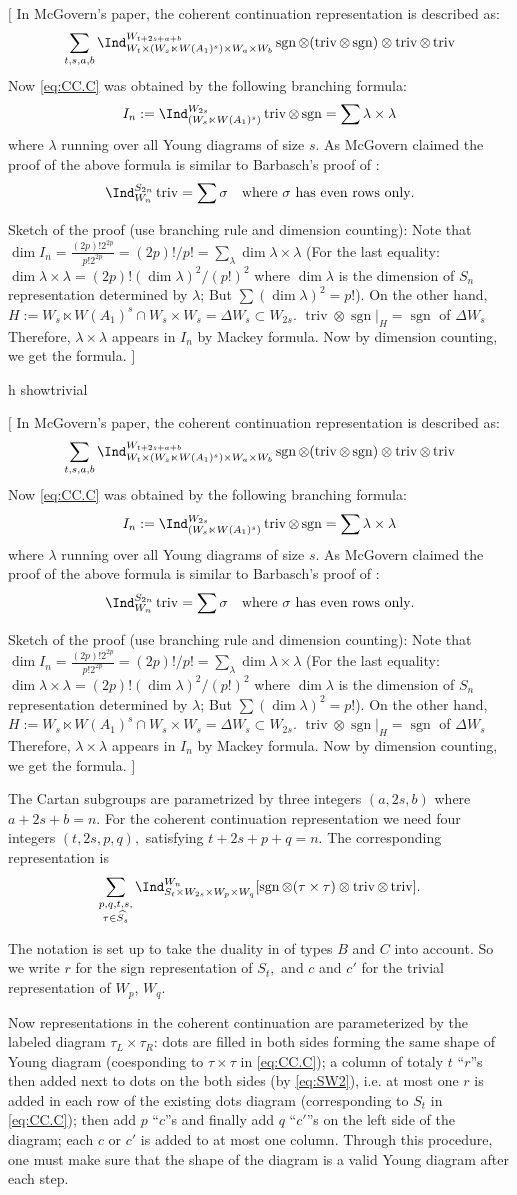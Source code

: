\documentclass[12pt,a4paper]{amsart}
\newcommand{\trivial}[2][]{\if\relax\detokenize{#1}\relax
  {%
      \color{orange} \vspace{0em} $[$  #2 $]$
      \color{black}
  }
  \else
\ifx#1h
\ifcsname showtrivial\endcsname
{%
    \color{orange} \vspace{0em}  $[$ #2 $]$
    \color{black}
}
\fi
\else {\red Wrong argument!} \fi
\fi
}
\newcommand{\sgn}{\operatorname{sgn}}
\newcommand{\triv}{\operatorname{triv}}
\numberwithin{equation}{section}
\theoremstyle{remark}
\begin{document}
\trivial{ In McGovern's paper, the coherent continuation representation is
  described as:
  \[
    \sum_{t,s,a,b}\Ind_{W_t\times (W_s\ltimes W(A_1)^s)\times W_a\times
      W_b}^{W_{t+2s+a+b}} \sgn\otimes (\triv \otimes \sgn)\otimes \triv\otimes
    \triv
  \]
  Now \eqref{eq:CC.C} was obtained by the following branching formula:
  \cite[p220 (6)]{Mc}
  \[
    I_n:= \Ind_{(W_s\ltimes W(A_1)^s)}^{W_{2s}}\triv\otimes \sgn = \sum
    \lambda\times \lambda
  \]
  where $\lambda$ running over all Young diagrams of size $s$.  As McGovern
  claimed the proof of the above formula is similar to Barbasch's proof of
  \cite[Lemma~4.1]{B.W}:
  \[
    \Ind_{W_n}^{S_{2n}} \triv = \sum \sigma \quad \text{where $\sigma$ has even
      rows only}.
  \]

  Sketch of the proof (use branching rule and dimension counting): Note that
  $\dim I_n = \frac{(2p)! 2^{2p}}{p! 2^{2p}} = (2p)!/p!  =\sum_\lambda \dim
  \lambda\times \lambda$ (For the last equality:
  $\dim \lambda\times \lambda = (2p)! (\dim \lambda)^2/(p!)^2$ where
  $\dim \lambda$ is the dimension of $S_n$ representation determined by
  $\lambda$; But $\sum (\dim \lambda)^2 = p!$).  On the other hand,
  $H :=W_s\ltimes W(A_1)^s\cap W_s\times W_s = \Delta W_s \subset W_{2s}$.
  $\triv \otimes \sgn|_H = \sgn$ of $\Delta W_s$ Therefore,
  $\lambda\times \lambda$ appears in $I_n$ by Mackey formula. Now by dimension
  counting, we get the formula.  }

The Cartan subgroups are parametrized by three integers $(a,2s,b)$ where
$a+2s+b=n.$ For the coherent continuation representation we need four integers
$(t,2s,p,q),$ satisfying $t+2s+p+q=n.$ The corresponding representation is
\begin{equation}
  \sum_{\substack{p,q,t,s,\\
      \tau\in \widehat{S_s}}} \Ind_{S_t\times W_{2s}\times W_p\times W_q}
  ^{W_n}[\sgn\otimes(\tau\times \tau)\otimes \triv\otimes \triv].
  \label{eq:CC.C}
\end{equation}

The notation is set up to take the duality in \cite{V4} of types $B$ and $C$
into account.  So we write $r$ for the sign representation of $S_t,$ and $c$ and
$c'$ for the trivial representation of $W_p$, $W_q$.

Now representations in the coherent continuation are parameterized by the
labeled diagram $\tau_L\times \tau_R$: dots are filled in both sides forming the
same shape of Young diagram (coesponding to $\tau\times \tau$ in
\eqref{eq:CC.C}); a column of totaly $t$ ``$r$''s then added next to dots on the
both sides (by \eqref{eq:SW2}), i.e. at most one $r$ is added in each row of the
existing dots diagram (corresponding to $S_t$ in \eqref{eq:CC.C}); then add $p$
``$c$''s and finally add $q$ ``$c'$''s on the left side of the diagram; each $c$
or $c'$ is added to at most one column.  Through this procedure, one must make
sure that the shape of the diagram is a valid Young diagram after each step.
\end{document}
